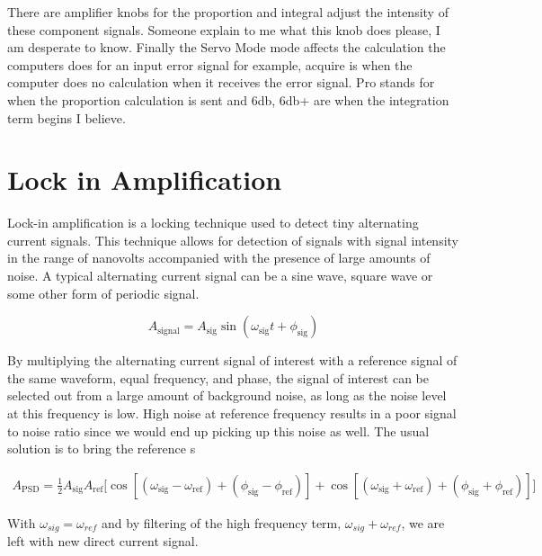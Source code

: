 \documentclass[11pt,a4paper]{book}
\begin{document}
			There are amplifier knobs for the proportion and integral adjust the intensity of these component signals. Someone explain to me what this knob does please, I am desperate to know.
			Finally the Servo Mode mode affects the calculation the computers does for an input error signal for example, acquire is when the computer does no calculation when it receives the error signal. Pro stands for when the proportion calculation is sent and 6db, 6db+ are when the integration term begins I believe.
		
	\section{Lock in Amplification}
		\label{sec:Lock in Amplification}
		Lock-in amplification is a locking technique used to detect tiny alternating current signals. This technique allows for detection of signals with signal intensity in the range of nanovolts accompanied with the presence of large amounts of noise. A typical alternating current signal can be a sine wave, square wave or some other form of periodic signal.
		
		\begin{equation} \label{eq:signal}
			A_{\text{signal}} = A_{\text{sig}} \sin({\omega_{\text{sig}} t + \phi_{\text{sig}}}) 
		\end{equation}
		
		By multiplying the alternating current signal of interest with a reference signal of the same waveform, equal frequency, and phase, the signal of interest can be selected out from a large amount of background noise, as long as the noise level at this frequency is low. High noise at reference frequency results in a poor signal to noise ratio since we would end up picking up this noise as well. The usual solution is to bring the reference s
		
		\begin{equation}
			\label{eq:PSDsignal}
			\begin{split}
				A_{\text{PSD}} 
				= \frac{1}{2} A_{\text{sig}} A_{\text{ref}}\big[ \cos{[( \omega_\text{sig}-\omega_{\text{ref}}) + (\phi_\text{sig} - \phi_{\text{ref}})]} 
				+ \cos{[(\omega_\text{sig} + \omega_{\text{ref}}) + (\phi_\text{sig} + \phi_{\text{ref}})]}\big] 
			\end{split}
		\end{equation}
		
		With $\omega_{sig}=\omega_{ref}$ and by filtering of the high frequency term, $\omega_{sig}+\omega_{ref}$, we are left with new direct current signal. 
		
\end{document}
